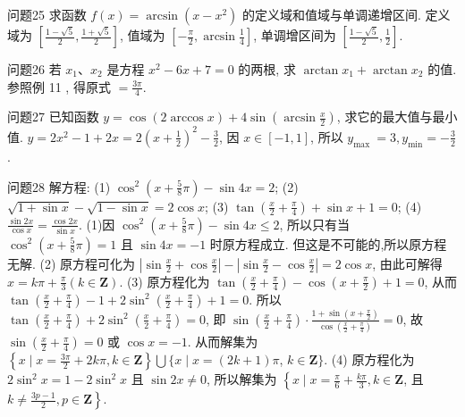 问题25 求函数 $f(x)=\arcsin \left(x-x^2\right)$ 的定义域和值域与单调递增区间.
定义域为 $\left[\frac{1-\sqrt{5}}{2}, \frac{1+\sqrt{5}}{2}\right]$, 值域为 $\left[-\frac{\pi}{2}, \arcsin \frac{1}{4}\right]$, 单调增区间为 $\left[\frac{1-\sqrt{5}}{2}, \frac{1}{2}\right]$.



问题26 若 $x_1 、 x_2$ 是方程 $x^2-6 x+7=0$ 的两根, 求 $\arctan x_1+\arctan x_2$ 的值.
参照例 11 , 得原式 $=\frac{3 \pi}{4}$.



问题27 已知函数 $y=\cos (2 \arccos x)+4 \sin \left(\arcsin \frac{x}{2}\right)$, 求它的最大值与最小值.
$y=2 x^2-1+2 x=2\left(x+\frac{1}{2}\right)^2-\frac{3}{2}$, 因 $x \in[-1,1]$, 所以 $y_{\text {max }}=3, y_{\min }=-\frac{3}{2}$.



问题28 解方程:
(1) $\cos ^2\left(x+\frac{5}{8} \pi\right)-\sin 4 x=2$;
(2) $\sqrt{1+\sin x}-\sqrt{1-\sin x}=2 \cos x$;
(3) $\tan \left(\frac{x}{2}+\frac{\pi}{4}\right)+\sin x+1=0$;
(4) $\frac{\sin 2 x}{\cos x}=\frac{\cos 2 x}{\sin x}$.
 (1)因 $\cos ^2\left(x+\frac{5}{8} \pi\right)-\sin 4 x \leqslant 2$, 所以只有当 $\cos ^2\left(x+\frac{5}{8} \pi\right)=1$ 且 $\sin 4 x=-1$ 时原方程成立.
但这是不可能的,所以原方程无解.
(2) 原方程可化为 $\left|\sin \frac{x}{2}+\cos \frac{x}{2}\right|-\left|\sin \frac{x}{2}-\cos \frac{x}{2}\right|=2 \cos x$, 由此可解得 $x=k \pi+ \frac{\pi}{3}(k \in \mathbf{Z})$. (3) 原方程化为 $\tan \left(\frac{x}{2}+\frac{\pi}{4}\right)-\cos \left(x+\frac{\pi}{2}\right)+1=0$, 从而 $\tan \left(\frac{x}{2}+\frac{\pi}{4}\right)-1+2 \sin ^2\left(\frac{x}{2}+\frac{\pi}{4}\right)+1=0$. 所以 $\tan \left(\frac{x}{2}+\frac{\pi}{4}\right)+2 \sin ^2\left(\frac{x}{2}+\right. \left.\frac{\pi}{4}\right)=0$, 即 $\sin \left(\frac{x}{2}+\frac{\pi}{4}\right) \cdot \frac{1+\sin \left(x+\frac{\pi}{2}\right)}{\cos \left(\frac{x}{2}+\frac{\pi}{4}\right)}=0$, 故 $\sin \left(\frac{x}{2}+\frac{\pi}{4}\right)=0$ 或 $\cos x=-1$. 从而解集为 $\left\{x \mid x=\frac{3 \pi}{2}+2 k \pi, k \in \mathbf{Z}\right\} \bigcup\{x \mid x=(2 k+1) \pi$, $k \in \mathbf{Z}\}$. (4) 原方程化为 $2 \sin ^2 x=1-2 \sin ^2 x$ 且 $\sin 2 x \neq 0$, 所以解集为 $\left\{x \mid x=\frac{\pi}{6}+\frac{k \pi}{3}, k \in \mathbf{Z}\right.$, 且 $\left.k \neq \frac{3 p-1}{2}, p \in \mathbf{Z}\right\}$.



